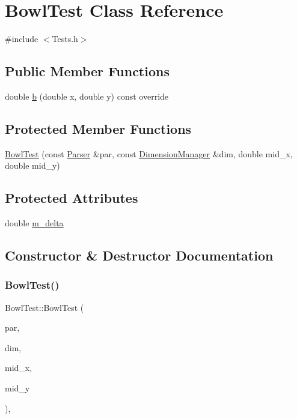 \hypertarget{classBowlTest}{}\section{Bowl\+Test Class Reference}
\label{classBowlTest}


{\ttfamily \#include $<$Tests.\+h$>$}

\subsection*{Public Member Functions}
\begin{DoxyCompactItemize}
\item 
double \hyperlink{classBowlTest_af8bd1eab2a63aa1a836424a587424c7e}{b} (double x, double y) const override
\end{DoxyCompactItemize}
\subsection*{Protected Member Functions}
\begin{DoxyCompactItemize}
\item 
\hyperlink{classBowlTest_ad643a9ff93a8bff97214c3e9608c158f}{Bowl\+Test} (const \hyperlink{structParser}{Parser} \&par, const \hyperlink{structDimensionManager}{Dimension\+Manager} \&dim, double mid\+\_\+x, double mid\+\_\+y)
\end{DoxyCompactItemize}
\subsection*{Protected Attributes}
\begin{DoxyCompactItemize}
\item 
double \hyperlink{classBowlTest_a17000e4b101eeefc34cf786f8973ad26}{m\+\_\+delta}
\end{DoxyCompactItemize}


\subsection{Constructor \& Destructor Documentation}
\mbox{\label{classBowlTest_ad643a9ff93a8bff97214c3e9608c158f}} 
\subsubsection{\texorpdfstring{Bowl\+Test()}{BowlTest()}}
{\footnotesize\ttfamily Bowl\+Test\+::\+Bowl\+Test (\begin{DoxyParamCaption}\item[{const \hyperlink{structParser}{Parser} \&}]{par,  }\item[{const \hyperlink{structDimensionManager}{Dimension\+Manager} \&}]{dim,  }\item[{double}]{mid\+\_\+x,  }\item[{double}]{mid\+\_\+y }\end{DoxyParamCaption})\hspace{0.3cm}{\ttfamily [inline]}, {\ttfamily [protected]}}




